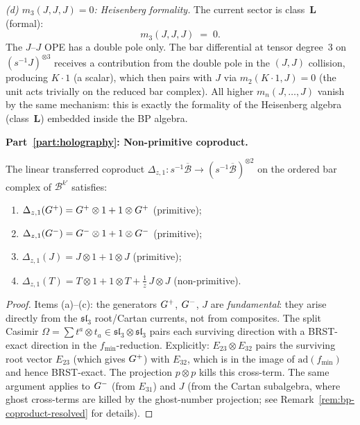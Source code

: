 \begin{computation}[The ordered bar complex of the
Bershadsky--Polyakov algebra
$\mathcal{B}^{k'} = W_{k'}(\mathfrak{sl}_3,f_{\min})$;
\ClaimStatusProvedHere]
\emph{(d) $m_3(J,J,J)=0$: Heisenberg formality.}
The current sector is class~$\mathbf{L}$ (formal):
\begin{equation}\label{eq:bp-m3-JJJ}
m_3(J,J,J) \;=\; 0.
\end{equation}
The $J$--$J$ OPE has a double pole only. The bar
differential at tensor degree~$3$ on
$(s^{-1}J)^{\otimes 3}$ receives a contribution from
the double pole in the $(J,J)$ collision, producing
$K\cdot 1$ (a scalar), which then pairs with $J$ via
$m_2(K\cdot 1,J)=0$ (the unit acts trivially on the
reduced bar complex). All higher $m_n(J,\dots,J)$
vanish by the same mechanism: this is exactly the formality
of the Heisenberg algebra (class~$\mathbf{L}$) embedded
inside the BP algebra.

\medskip
\noindent\textbf{Part~\ref{part:holography}: Non-primitive coproduct.}

\begin{proposition}
\label{prop:bp-coproduct}
The linear transferred coproduct
$\Delta_{z,1}\colon s^{-1}\overline{\mathcal{B}}
\to (s^{-1}\overline{\mathcal{B}})^{\otimes 2}$
on the ordered bar complex of $\mathcal{B}^{k'}$ satisfies:
\begin{enumerate}[label=\textup{(\alph*)}]
\item $\Delta_{z,1}(G^+)
= G^+\otimes 1 + 1\otimes G^+$
\quad\textup{(primitive)};
\item $\Delta_{z,1}(G^-)
= G^-\otimes 1 + 1\otimes G^-$
\quad\textup{(primitive)};
\item $\Delta_{z,1}(J)
= J\otimes 1 + 1\otimes J$
\quad\textup{(primitive)};
\item $\Delta_{z,1}(T)
= T\otimes 1 + 1\otimes T
+ \frac{1}{z}\,J\otimes J$
\quad\textup{(non-primitive)}.
\end{enumerate}
\end{proposition}

\begin{proof}
Items (a)--(c): the generators $G^+$, $G^-$, $J$ are
\emph{fundamental}: they arise directly from the
$\mathfrak{sl}_3$ root/Cartan currents, not from
composites. The split Casimir
$\Omega=\sum t^a\otimes t_a\in
\mathfrak{sl}_3\otimes\mathfrak{sl}_3$
pairs each surviving direction with a BRST-exact direction
in the $f_{\min}$-reduction. Explicitly:
$E_{23}\otimes E_{32}$ pairs the surviving root vector
$E_{23}$ (which gives $G^+$) with $E_{32}$, which is in the
image of $\mathrm{ad}(f_{\min})$ and hence BRST-exact.
The projection $p\otimes p$ kills this cross-term.
The same argument applies to $G^-$ (from $E_{31}$)
and $J$ (from the Cartan subalgebra, where ghost
cross-terms are killed by the ghost-number projection;
see Remark~\ref{rem:bp-coproduct-resolved} for details).


\end{proof}
\end{computation}
